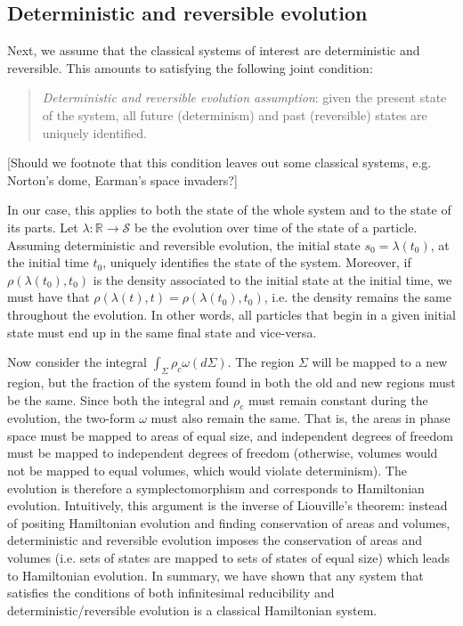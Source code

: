 \documentclass[letterpaper]{article}
\begin{document}
\subsection{Deterministic and reversible evolution}
\label{deterministic}

Next, we assume that the classical systems of interest are deterministic and reversible. This amounts to satisfying the following joint condition:

\begin{quotation}
\noindent
\textit{Deterministic and reversible evolution assumption}: given the present state of the system, all future (determinism) and past (reversible) states are uniquely identified.

\end{quotation}

[Should we footnote that this condition leaves out some classical systems, e.g. Norton's dome, Earman's space invaders?]

In our case, this applies to both the state of the whole system and to the state of its parts. Let $\lambda: \mathbb{R} \to \mathcal{S}$ be the evolution over time of the state of a particle. Assuming deterministic and reversible evolution, the initial state $s_0 = \lambda(t_0)$, at the initial time $t_0$, uniquely identifies the state of the system. Moreover, if $\rho(\lambda(t_0), t_0)$ is the density associated to the initial state at the initial time, we must have that $\rho(\lambda(t), t) = \rho(\lambda(t_0), t_0)$, i.e. the density remains the same throughout the evolution. In other words, all particles that begin in a given initial state must end up in the same final state and vice-versa.  

Now consider the integral $\int_{\Sigma} \rho_c \omega(d\Sigma)$. The region $\Sigma$ will be mapped to a new region, but the fraction of the system found in both the old and new regions must be the same. Since both the integral and $\rho_c$ must remain constant during the evolution, the two-form $\omega$ must also remain the same. That is, the areas in phase space must be mapped to areas of equal size, and independent degrees of freedom must be mapped to independent degrees of freedom (otherwise, volumes would not be mapped to equal volumes, which would violate determinism). The evolution is therefore a symplectomorphism and corresponds to Hamiltonian evolution. Intuitively, this argument is the inverse of Liouville's theorem: instead of positing Hamiltonian evolution and finding conservation of areas and volumes, deterministic and reversible evolution imposes the conservation of areas and volumes (i.e. sets of states are mapped to sets of states of equal size) which leads to Hamiltonian evolution. In summary, we have shown that any system that satisfies the conditions of both infinitesimal reducibility and deterministic/reversible evolution is a classical Hamiltonian system.
\end{document}

